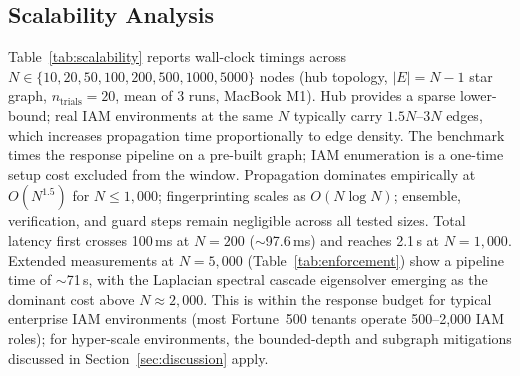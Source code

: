 \documentclass[conference,a4paper]{IEEEtran}
\begin{document}
\subsection{Scalability Analysis}

Table~\ref{tab:scalability} reports wall-clock timings across
$N\in\{10,20,50,100,200,500,1000,5000\}$ nodes (hub topology,
$|E|{=}N{-}1$ star graph, $n_{\text{trials}}=20$, mean of 3 runs,
MacBook M1). Hub provides a sparse lower-bound; real IAM environments
at the same $N$ typically carry $1.5N$--$3N$ edges, which increases
propagation time proportionally to edge density.
The benchmark times the response pipeline on a pre-built graph; IAM
enumeration is a one-time setup cost excluded from the window.
Propagation dominates empirically at $O(N^{1.5})$ for $N\le1{,}000$;
fingerprinting scales as $O(N \log N)$; ensemble, verification, and
guard steps remain negligible across all tested sizes.
Total latency first crosses 100\,ms at $N{=}200$ ($\sim$97.6\,ms)
and reaches 2.1\,s at $N{=}1{,}000$.
Extended measurements at $N{=}5{,}000$ (Table~\ref{tab:enforcement})
show a pipeline time of $\sim$71\,s, with the Laplacian spectral
cascade eigensolver emerging as the dominant cost above $N{\approx}2{,}000$.
This is within the response budget for typical enterprise IAM environments
(most Fortune~500 tenants operate 500--2{,}000 IAM roles); for
hyper-scale environments, the bounded-depth and subgraph mitigations
discussed in Section~\ref{sec:discussion} apply.
\end{document}
